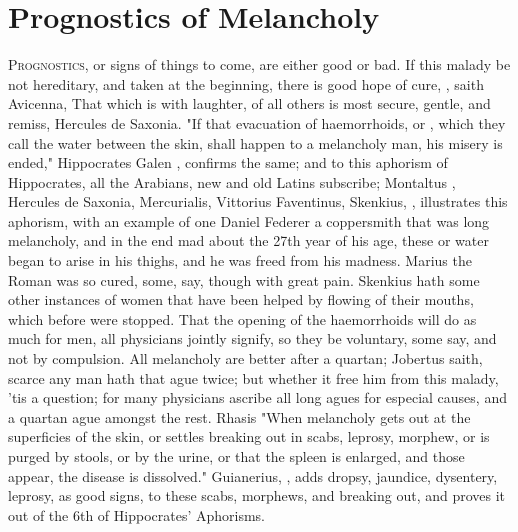 \chapter{Prognostics of Melancholy}\label{ch:prognostics}

\lettrine{P}{rognostics}, or signs of things to come, are either good or bad.
If this malady be not hereditary, and taken at the beginning, there is good
hope of cure, , saith Avicenna,
 That which is with
laughter, of all others is most secure, gentle, and remiss, Hercules de
Saxonia. "If that evacuation of haemorrhoids, or
, which they call the water between the skin, shall happen to a
melancholy man, his misery is ended," Hippocrates  Galen , confirms
the same; and to this aphorism of Hippocrates, all the Arabians, new and old
Latins subscribe; Montaltus , Hercules de Saxonia,
Mercurialis, Vittorius Faventinus, \etc{} Skenkius, , illustrates this aphorism, with an example of one
Daniel Federer a coppersmith that was long melancholy, and in the end mad about
the 27th year of his age, these  or water began to arise in his
thighs, and he was freed from his madness. Marius the Roman was so cured, some,
say, though with great pain. Skenkius hath some other instances of women that
have been helped by flowing of their mouths, which before were stopped. That
the opening of the haemorrhoids will do as much for men, all physicians jointly
signify, so they be voluntary, some say, and not by compulsion. All melancholy
are better after a quartan; Jobertus saith, scarce any man
hath that ague twice; but whether it free him from this malady, 'tis a
question; for many physicians ascribe all long agues for especial causes, and a
quartan ague amongst the rest. Rhasis
 "When melancholy gets out at the
superficies of the skin, or settles breaking out in scabs, leprosy, morphew, or
is purged by stools, or by the urine, or that the spleen is enlarged, and those
 appear, the disease is dissolved." Guianerius,
, adds dropsy, jaundice, dysentery,
leprosy, as good signs, to these scabs, morphews, and breaking out, and proves
it out of the 6th of Hippocrates' Aphorisms.

